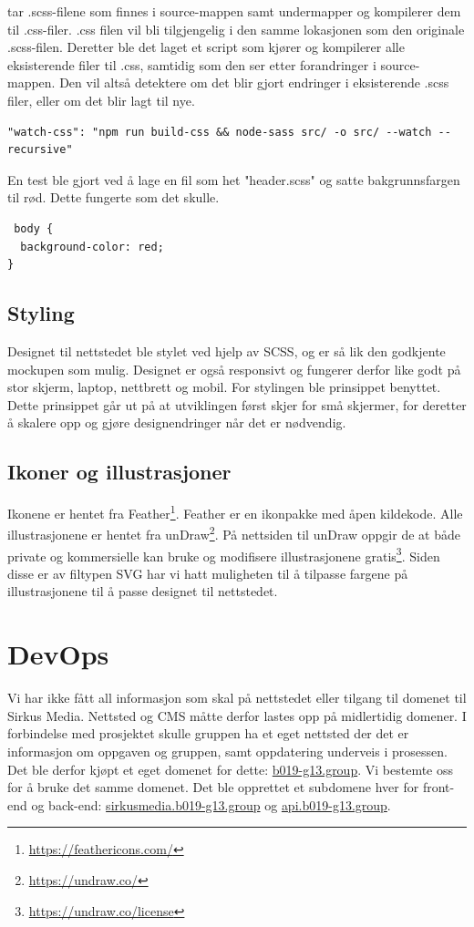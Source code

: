  tar .scss-filene som finnes i source-mappen samt undermapper og kompilerer dem til .css-filer. .css filen vil bli tilgjengelig i den samme lokasjonen som den originale .scss-filen. Deretter ble det laget et script som kjører  og kompilerer alle eksisterende filer til .css, samtidig som den ser etter forandringer i source-mappen. Den vil altså detektere om det blir gjort endringer i eksisterende .scss filer, eller om det blir lagt til nye. 

\begin{lstlisting}[caption={Script som detekterer scss endringer}]
 "watch-css": "npm run build-css && node-sass src/ -o src/ --watch --recursive"
\end{lstlisting}

En test ble gjort ved å lage en fil som het "header.scss" og satte bakgrunnsfargen til rød. Dette fungerte som det skulle.

\begin{lstlisting}
 body {
  background-color: red;
}
\end{lstlisting}

\subsection{Styling}
Designet til nettstedet ble stylet ved hjelp av SCSS, og er så lik den godkjente mockupen som mulig. Designet er også responsivt og fungerer derfor like godt på stor skjerm, laptop, nettbrett og mobil. For stylingen ble prinsippet  benyttet. Dette prinsippet går ut på at utviklingen først skjer for små skjermer, for deretter å skalere opp og gjøre designendringer når det er nødvendig. 

\subsection{Ikoner og illustrasjoner}
Ikonene er hentet fra Feather\footnote{\url{https://feathericons.com/}}. Feather er en ikonpakke med åpen kildekode. Alle illustrasjonene er hentet fra unDraw\footnote{\url{https://undraw.co/}}. På nettsiden til unDraw oppgir de at både private og kommersielle kan bruke og modifisere illustrasjonene gratis\footnote{\url{https://undraw.co/license}}. Siden disse er av filtypen SVG har vi hatt muligheten til å tilpasse fargene på illustrasjonene til å passe designet til nettstedet.

\section{DevOps}
Vi har ikke fått all informasjon som skal på nettstedet eller tilgang til domenet til Sirkus Media. Nettsted og CMS måtte derfor lastes opp på midlertidig domener.
I forbindelse med prosjektet skulle gruppen ha et eget nettsted der det er informasjon om oppgaven og gruppen, samt oppdatering underveis i prosessen. Det ble derfor kjøpt et eget domenet for dette: \url{b019-g13.group}. Vi bestemte oss for å bruke det samme domenet. Det ble opprettet et subdomene hver for front-end og back-end: \url{sirkusmedia.b019-g13.group} og \url{api.b019-g13.group}.

